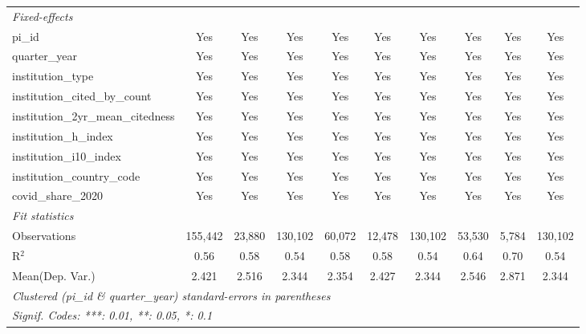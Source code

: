 \begin{tabular}{lccccccccc}
   \midrule
   \emph{Fixed-effects}\\
   pi\_id                                                      & Yes           & Yes            & Yes           & Yes           & Yes           & Yes           & Yes           & Yes            & Yes\\  
   quarter\_year                                               & Yes           & Yes            & Yes           & Yes           & Yes           & Yes           & Yes           & Yes            & Yes\\  
   institution\_type                                           & Yes           & Yes            & Yes           & Yes           & Yes           & Yes           & Yes           & Yes            & Yes\\  
   institution\_cited\_by\_count                               & Yes           & Yes            & Yes           & Yes           & Yes           & Yes           & Yes           & Yes            & Yes\\  
   institution\_2yr\_mean\_citedness                           & Yes           & Yes            & Yes           & Yes           & Yes           & Yes           & Yes           & Yes            & Yes\\  
   institution\_h\_index                                       & Yes           & Yes            & Yes           & Yes           & Yes           & Yes           & Yes           & Yes            & Yes\\  
   institution\_i10\_index                                     & Yes           & Yes            & Yes           & Yes           & Yes           & Yes           & Yes           & Yes            & Yes\\  
   institution\_country\_code                                  & Yes           & Yes            & Yes           & Yes           & Yes           & Yes           & Yes           & Yes            & Yes\\  
   covid\_share\_2020                                          & Yes           & Yes            & Yes           & Yes           & Yes           & Yes           & Yes           & Yes            & Yes\\  
   \midrule
   \emph{Fit statistics}\\
   Observations                                                & 155,442       & 23,880         & 130,102       & 60,072        & 12,478        & 130,102       & 53,530        & 5,784          & 130,102\\  
   R$^2$                                                       & 0.56          & 0.58           & 0.54          & 0.58          & 0.58          & 0.54          & 0.64          & 0.70           & 0.54\\  
Mean(Dep. Var.) & 2.421 & 2.516 & 2.344 & 2.354 & 2.427 & 2.344 & 2.546 & 2.871 & 2.344 \\
   \midrule \midrule
   \multicolumn{10}{l}{\emph{Clustered (pi\_id \& quarter\_year) standard-errors in parentheses}}\\
   \multicolumn{10}{l}{\emph{Signif. Codes: ***: 0.01, **: 0.05, *: 0.1}}\\
\end{tabular}
\par\endgroup
